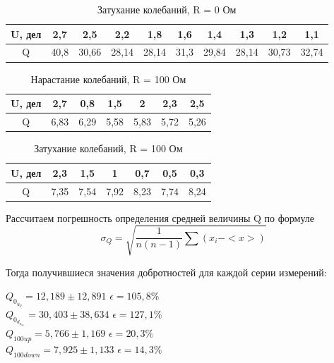 \documentclass[a4paper, fontsize = 14pt]{article}
\begin{document}
\begin{table}[h!]
\centering
\begin{tabular}{|c|c|c|c|c|c|c|c|c|c|}
\hline
U, дел & 2,7  & 2,5   & 2,2   & 1,8   & 1,6  & 1,4   & 1,3   & 1,2   & 1,1   \\ \hline
Q      & 40,8 & 30,66 & 28,14 & 28,14 & 31,3 & 29,84 & 28,14 & 30,73 & 32,74 \\ \hline
\end{tabular}
    \caption{Затухание колебаний, R = 0 Ом}
\end{table}



\begin{table}[h!]
\centering
\begin{tabular}{|c|c|c|c|c|c|c|}
\hline
U, дел & 2,7  & 0,8  & 1,5  & 2    & 2,3  & 2,5  \\ \hline
Q      & 6,83 & 6,29 & 5,58 & 5,83 & 5,72 & 5,26 \\ \hline
\end{tabular}
    \caption{Нарастание колебаний, R = 100 Ом}
\end{table}


\begin{table}[h!]
\centering
\begin{tabular}{|c|c|c|c|c|c|c|}
\hline
U, дел & 2,3  & 1,5  & 1    & 0,7  & 0,5  & 0,3  \\ \hline
Q      & 7,35 & 7,54 & 7,92 & 8,23 & 7,74 & 8,24 \\ \hline
\end{tabular}
\caption{Затухание колебаний, R = 100 Ом}
\end{table}
    
 

Рассчитаем погрешность определения средней величины Q по формуле $$\sigma_Q = \sqrt{\frac{1}{n(n-1)}\sum(x_i - <x>)}$$

Тогда получившиеся значения добротностей для каждой серии измерений:

\begin{center}
 
    $Q_0_u_p = 12,189 \pm 12,891$ \hspace{1cm}  $\epsilon = 105,8\% $ \\
    $Q_0_d_o_w_n = 30,403 \pm 38,634$  \hspace{1cm} $\epsilon = 127,1\% $\\
    $Q_{100 up} = 5,766 \pm 1,169$ \hspace{1cm}  $ \epsilon = 20,3\% $ \\
    $Q_{100 down} = 7,925 \pm 1,133$ \hspace{1cm}  $\epsilon = 14,3\% $
\end{center}
\end{document}

